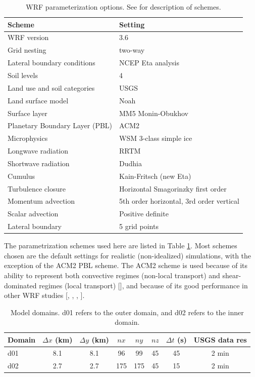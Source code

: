 \begin{table}
\begin{tabular}{l l}
\hline
Scheme & Setting \\ \hline
WRF version & 3.6 \\
Grid nesting & two-way \\
Lateral boundary conditions & NCEP Eta analysis \\
Soil levels & 4 \\
Land use and soil categories & USGS \\
Land surface model & Noah \\
Surface layer & MM5 Monin-Obukhov \\
Planetary Boundary Layer (PBL) & ACM2 \\
Microphysics & WSM 3-class simple ice \\
Longwave radiation & RRTM \\
Shortwave radiation & Dudhia \\
Cumulus & Kain-Fritsch (new Eta) \\
Turbulence closure & Horizontal Smagorinzky first order \\
Momentum advection & 5th order horizontal, 3rd order vertical \\
Scalar advection & Positive definite \\
Lateral boundary & 5 grid points \\
\hline
\end{tabular}
\caption{WRF parameterization options.  See \cite{skamarock2008} for description of schemes.}
\label{table:BL_paramschemes}
\end{table}

The parametrization schemes used here are listed in Table \ref{table:BL_paramschemes}.  Most schemes chosen are the default settings for realistic (non-idealized) simulations, with the exception of the ACM2 PBL scheme. The ACM2 scheme is used because of its ability to represent both convective regimes (non-local transport) and shear-dominated regimes (local transport) [\cite{pleim2007combined}], and because of its good performance in other WRF studies [\cite{xie2012evaluation}, \cite{xie2013structure}, \cite{deppe2013wrf}, \cite{marjanovic2014}].

\begin{table}
\begin{tabular}{ l c c c c c c c }
\hline
Domain & $\Delta x$ (km) & $\Delta y$ (km) & $nx$ & $ny$ & $nz$ & $\Delta t$ (s) & USGS data res \\ \hline
d01 & 8.1 & 8.1 & 96 & 99 & 45 & 45 & 2 min\\
d02 & 2.7 & 2.7 & 175 & 175 & 45 & 15 & 2 min\\
\hline
\end{tabular}
\caption{Model domains. d01 refers to the outer domain, and d02 refers to the inner domain.}
\label{table:BL_domains}
\end{table}

